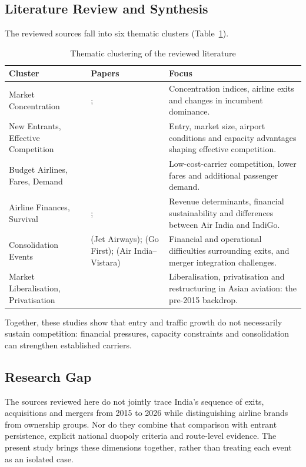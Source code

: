 \documentclass[12pt,a4paper]{article}
\begin{document}
\subsection{Literature Review and Synthesis}
The reviewed sources fall into six thematic clusters (Table~\ref{tab:lit-clusters}).

\begin{table}[!htbp]
\centering
\caption{Thematic clustering of the reviewed literature}\label{tab:lit-clusters}
\small
\begin{tabularx}{\textwidth}{|>{\raggedright\arraybackslash}p{}|>{\raggedright\arraybackslash}X|>{\raggedright\arraybackslash}X|}
\hline
\textbf{Cluster} & \textbf{Papers} & \textbf{Focus} \\
\hline
Market Concentration & \textcite{kumari2026soaring}; \textcite{grosche2020concentration} & Concentration indices, airline exits and changes in incumbent dominance. \\
\hline
New Entrants, Effective Competition & \textcite{oliveira2018effective} & Entry, market size, airport conditions and capacity advantages shaping effective competition. \\
\hline
Budget Airlines, Fares, Demand & \textcite{wang2018determinants} & Low-cost-carrier competition, lower fares and additional passenger demand. \\
\hline
Airline Finances, Survival & \textcite{jayathilakan2024determinants}; \textcite{ali2019impact} & Revenue determinants, financial sustainability and differences between Air India and IndiGo. \\
\hline
Consolidation Events & \textcite{soman2024jet} (Jet Airways); \textcite{jasrotia2025gofirst} (Go First); \textcite{chaudhary2023airindia} (Air India--Vistara) & Financial and operational difficulties surrounding exits, and merger integration challenges. \\
\hline
Market Liberalisation, Privatisation & \textcite{findlay2004liberalization} & Liberalisation, privatisation and restructuring in Asian aviation: the pre-2015 backdrop. \\
\hline
\end{tabularx}
\end{table}


Together, these studies show that entry and traffic growth do not necessarily sustain competition: financial pressures, capacity constraints and consolidation can strengthen established carriers.

\subsection{Research Gap}
The sources reviewed here do not jointly trace India's sequence of exits, acquisitions and mergers from 2015 to 2026 while distinguishing airline brands from ownership groups. Nor do they combine that comparison with entrant persistence, explicit national duopoly criteria and route-level evidence. The present study brings these dimensions together, rather than treating each event as an isolated case.
\end{document}
